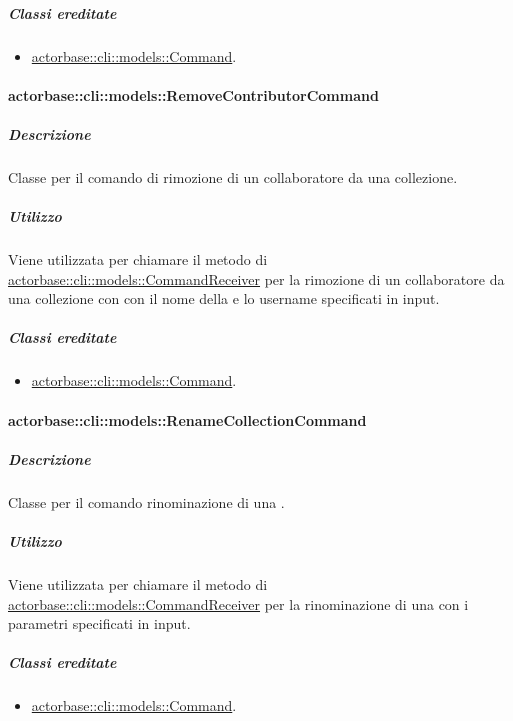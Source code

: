 \documentclass{scalatekids-article}
\begin{document}
\subparagraph{Classi ereditate}

\begin{itemize}
\item \hyperref[sec:actorbase::cli::models::Command]{actorbase::cli::models::Command}.
\end{itemize}

\paragraph{actorbase::cli::models::RemoveContributorCommand}
\label{sec:actorbase::cli::models::RemoveContributorCommand}

\subparagraph{Descrizione}

Classe per il comando di rimozione di un collaboratore da una collezione.

\subparagraph{Utilizzo}

Viene utilizzata per chiamare il metodo di
\hyperref[sec:actorbase::cli::models::CommandReceiver]{actorbase::cli::models::CommandReceiver} per la rimozione di un collaboratore
da una collezione con con il nome della  e lo username
specificati in input.

\subparagraph{Classi ereditate}

\begin{itemize}
\item \hyperref[sec:actorbase::cli::models::Command]{actorbase::cli::models::Command}.
\end{itemize}

\paragraph{actorbase::cli::models::RenameCollectionCommand}
\label{sec:actorbase::cli::models::RenameCollectionCommand}

\subparagraph{Descrizione}

Classe per il comando rinominazione di una .

\subparagraph{Utilizzo}

Viene utilizzata per chiamare il metodo di \hyperref[sec:actorbase::cli::models::CommandReceiver]{actorbase::cli::models::CommandReceiver} per la rinominazione di una  con i parametri specificati in input.

\subparagraph{Classi ereditate}

\begin{itemize}
\item \hyperref[sec:actorbase::cli::models::Command]{actorbase::cli::models::Command}.
\end{itemize}
\end{document}
